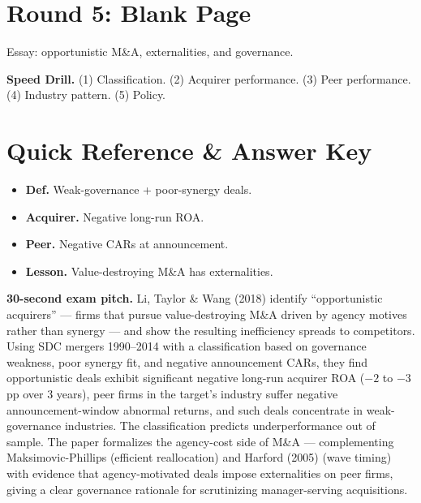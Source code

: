 \documentclass[11pt]{article}
\begin{document}
\section*{Round 5: Blank Page}
Essay: opportunistic M\&A, externalities, and governance.

\vspace{6pt}
\begin{drillbox}
\textbf{Speed Drill.} (1) Classification. (2) Acquirer performance. (3) Peer performance. (4) Industry pattern. (5) Policy.
\end{drillbox}

\section*{Quick Reference \& Answer Key}
\begin{answerbox}
\begin{itemize}
\item \textbf{Def.} Weak-governance + poor-synergy deals.
\item \textbf{Acquirer.} Negative long-run ROA.
\item \textbf{Peer.} Negative CARs at announcement.
\item \textbf{Lesson.} Value-destroying M\&A has externalities.
\end{itemize}
\end{answerbox}

\begin{keybox}
\textbf{30-second exam pitch.} Li, Taylor \& Wang (2018) identify ``opportunistic acquirers'' --- firms that pursue value-destroying M\&A driven by agency motives rather than synergy --- and show the resulting inefficiency spreads to competitors. Using SDC mergers 1990--2014 with a classification based on governance weakness, poor synergy fit, and negative announcement CARs, they find opportunistic deals exhibit significant negative long-run acquirer ROA ($-2$ to $-3$ pp over 3 years), peer firms in the target's industry suffer negative announcement-window abnormal returns, and such deals concentrate in weak-governance industries. The classification predicts underperformance out of sample. The paper formalizes the agency-cost side of M\&A --- complementing Maksimovic-Phillips (efficient reallocation) and Harford (2005) (wave timing) with evidence that agency-motivated deals impose externalities on peer firms, giving a clear governance rationale for scrutinizing manager-serving acquisitions.
\end{keybox}
\end{document}
